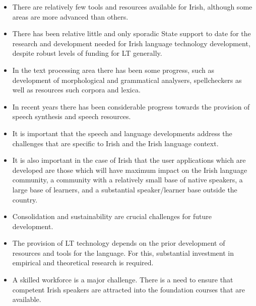 \begin{multicols}{2}
\begin{itemize}
\item There are relatively few tools and resources available for Irish, although some areas are more advanced than others. 
\item There has been relative little and only sporadic State support to date for the research and development needed for Irish language technology development, despite robust levels of funding for LT generally.
\item In the text processing area there has been some progress, such as development of morphological and grammatical analysers, spellcheckers as well as resources such corpora and lexica.
\item In recent years there has been considerable progress towards the provision of speech synthesis and speech resources. 
\item It is important that the speech and language developments address  the challenges that are specific to Irish and the Irish language context. 
\item It is also important in the case of Irish that the user applications which are developed are those which will have maximum impact on the Irish language community, a community with a relatively small base of native speakers, a large base of learners, and a substantial speaker/learner base outside the country. 
\item Consolidation and sustainability are crucial challenges for future development. 
\item The provision of LT technology depends on the prior development of resources and tools for the language. For this, substantial investment in empirical and theoretical research is required.
\item A skilled workforce is a major challenge. There is a need to ensure that competent Irish speakers are attracted into the foundation courses that are available.
\end{itemize}



\end{multicols}
